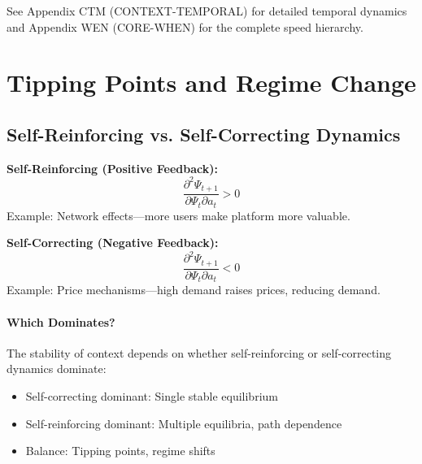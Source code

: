 \begin{cross-reference}
See Appendix CTM (CONTEXT-TEMPORAL) for detailed temporal dynamics
and Appendix WEN (CORE-WHEN) for the complete speed hierarchy.
\end{cross-reference}



\section{Tipping Points and Regime Change}
\label{sec:context-tipping}


\subsection{Self-Reinforcing vs. Self-Correcting Dynamics}

\begin{definition}
\textbf{Self-Reinforcing (Positive Feedback):}
\begin{equation}
\frac{\partial^2 \Psi_{t+1}}{\partial \Psi_t \partial a_t} > 0
\end{equation}
Example: Network effects---more users make platform more valuable.

\textbf{Self-Correcting (Negative Feedback):}
\begin{equation}
\frac{\partial^2 \Psi_{t+1}}{\partial \Psi_t \partial a_t} < 0
\end{equation}
Example: Price mechanisms---high demand raises prices, reducing demand.
\end{definition}

\paragraph{Which Dominates?}
The stability of context depends on whether self-reinforcing or
self-correcting dynamics dominate:
\begin{itemize}[nosep]
  \item Self-correcting dominant: Single stable equilibrium
  \item Self-reinforcing dominant: Multiple equilibria, path dependence
  \item Balance: Tipping points, regime shifts
\end{itemize}

